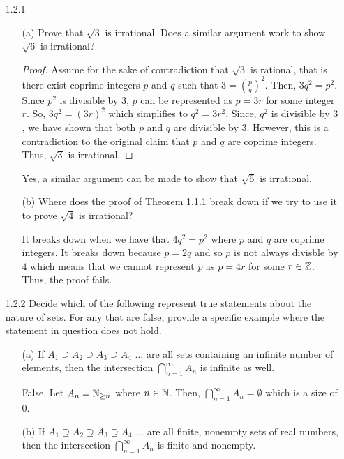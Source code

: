 \documentclass[12pt,letterpaper]{article}
\begin{document}
\begin{itemize}[leftmargin=!,labelindent=5pt]
    \item[1.2.1]
        \begin{itemize}
            \item [(a)] Prove that $\sqrt{3}$ is irrational. Does a similar argument work to show $\sqrt{6}$ is irrational?
                \begin{proof}
                    Assume for the sake of contradiction that $\sqrt{3}$ is rational, that is there exist coprime integers $p$ and $q$ such that $3 = (\frac{p}{q})^2$. 
                    Then, $3q^2 = p^2$. 
                    Since $p^2$ is divisible by $3$, $p$ can be represented as $p = 3r$ for some integer $r$.
                    So, $3q^2 = (3r)^2$ which simplifies to $q^2 = 3r^2$.
                    Since, $q^2$ is divisible by $3$, we have shown that both $p$ and $q$ are divisible by $3$.
                    However, this is a contradiction to the original claim that $p$ and $q$ are coprime integers.
                    Thus, $\sqrt{3}$ is irrational.
                \end{proof}
                
                Yes, a similar argument can be made to show that $\sqrt{6}$ is irrational.
            \item [(b)] Where does the proof of Theorem 1.1.1 break down if we try to use it to prove $\sqrt{4}$ is irrational?
            
            It breaks down when we have that $4q^2 = p^2$ where $p$ and $q$ are coprime integers. It breaks down because $p = 2q$ and so $p$ is not always divisble by $4$ which means that we cannot represent $p$ as $p=4r$ for some $r\in \mathbb{Z}$. Thus, the proof fails.
        \end{itemize}
    \item[1.2.2] Decide which of the following represent true statements about the nature of sets. For any that are false, provide a specific example where the statement in question does not hold.
        \begin{itemize}
            \item [(a)] If $A_1 \supseteq A_2 \supseteq A_3 \supseteq A_4$ ... are all sets containing an infinite number of elements, then the intersection $\bigcap_{n=1}^{\infty}A_n$ is infinite as well.
            
            False. Let $A_n = \mathbb{N}_{\geq n}$ where $n \in \mathbb{N}$. Then, $\bigcap_{n=1}^{\infty}A_n = \emptyset$ which is a size of 0.
            \item [(b)] If $A_1 \supseteq A_2 \supseteq A_3 \supseteq A_4$ ... are all finite, nonempty sets of real numbers, then the intersection $\bigcap_{n=1}^{\infty}A_n$ is finite and nonempty.
            

\end{itemize}
\end{itemize}
\end{document}
